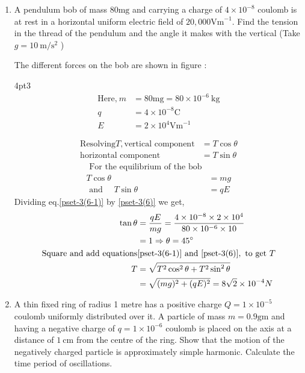 \begin{enumerate}[label=\color{ocre}\textbf{\arabic*.}]
\begin{answer}
\end{answer}
\item A pendulum bob of mass $80 \mathrm{mg}$ and carrying a charge of $4 \times 10^{-8}$ coulomb is at rest in a horizontal uniform electric field of $20,000 \mathrm{Vm}^{-1}$. Find the tension in the thread of the pendulum and the angle it makes with the vertical (Take $g=10 \mathrm{~m} / \mathrm{s}^{2}$ )
\opencutright
\renewcommand\windowpagestuff{
	\centering\texttt{[image: pset-3(6)]}}
\begin{answer}
	The different forces on the bob are shown in figure :
	\begin{cutout}{2}{\dimexpr\linewidth-6cm\relax}{4pt}{3}
	\begin{align*}
	\text{Here,}\ m&=80 \mathrm{mg}=80 \times 10^{-6} \mathrm{~kg}\\
	q&=4 \times 10^{-8} \mathrm{C}\\
	{E}&=2 \times 10^{4} \mathrm{Vm}^{-1}
	\end{align*}
  \end{cutout}
	\begin{align*}
\text{Resolving} T,
\text{vertical component}&=T \cos \theta\\
\text{horizontal component}&=T \sin \theta
\end{align*}
	\begin{align}
\text{	For the equilibrium of the bob}\\
T \cos \theta&=m g \label{pset-3(6)}\\
\text { and } \quad T \sin \theta&=q E \label{pset-3(6-1)}
\end{align}
	Dividing eq.\ref{pset-3(6-1)} by \ref{pset-3(6)} we get,
\begin{align*}
\tan \theta&=\frac{q E}{m g}=\frac{4 \times 10^{-8} \times 2 \times 10^{4}}{80 \times 10^{-6} \times 10}\\&=1 \Rightarrow \theta=45^{\circ}\\
\text{Square and add equations}& \ref{pset-3(6-1)} \text{  and  } \ref{pset-3(6)},\text{ to get } T
\\T&=\sqrt{T ^{2}\cos^{2}\theta +T^{2} \sin^{2}\theta}\\
&=\sqrt{(m g)^{2}+(q E)^{2}} =
8 \sqrt{2} \times 10^{-4} N
\end{align*}
\end{answer}
\item A thin fixed ring of radius 1 metre has a positive charge $Q=1 \times 10^{-5}$ coulomb uniformly distributed over it. A particle of mass $m=0.9 \mathrm{gm}$ and having a negative charge of $q=1 \times 10^{-6}$ coulomb is placed on the axis at a distance of $1 \mathrm{~cm}$ from the centre of the ring. Show that the motion of the negatively charged particle is approximately simple harmonic. Calculate the time period of oscillations.


\end{enumerate}

